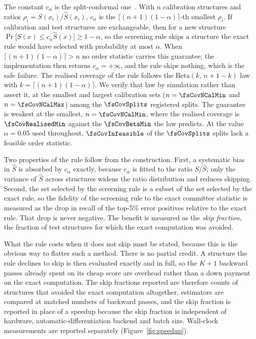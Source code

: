 The constant $c_\alpha$ is the split-conformal
one~\citep{vovk2005algorithmic,lei2018distribution}. With $n$ calibration
structures and ratios $\rho_i=S(x_i)/\hat S(x_i)$, $c_\alpha$ is the
$\lceil (n+1)(1-\alpha)\rceil$-th smallest $\rho_i$. If calibration and test
structures are exchangeable, then for a new structure
$\Pr\bigl[S(x)\le c_\alpha\hat S(x)\bigr]\ge 1-\alpha$, so the screening rule
skips a structure the exact rule would have selected with probability at most
$\alpha$. When $\lceil (n+1)(1-\alpha)\rceil>n$ no order statistic carries
this guarantee; the implementation then returns $c_\alpha=+\infty$, and the
rule skips nothing, which is the safe failure. The realised coverage of the
rule follows the $\mathrm{Beta}(k,\,n+1-k)$ law with
$k=\lceil (n+1)(1-\alpha)\rceil$. We verify that law by simulation rather
than assert it, at the smallest and largest calibration sets
($n=\fsCovNCalMin$ and $n=\fsCovNCalMax$) among the $\fsCovSplits$ registered
splits. The guarantee is weakest at the smallest, $n=\fsCovNCalMin$, where the
realised coverage is $\fsCovRealisedMin$ against the $\fsCovBetaMin$ the law
predicts. At the value $\alpha=0.05$ used throughout, $\fsCovInfeasible$ of
the $\fsCovSplits$ splits lack a feasible order statistic.

Two properties of the rule follow from the construction. First, a systematic
bias in $\hat S$ is absorbed by $c_\alpha$ exactly, because $c_\alpha$ is
fitted to the ratio $S/\hat S$; only the variance of $\hat S$ across
structures widens the ratio distribution and reduces skipping. Second, the set
selected by the screening rule is a subset of the set selected by the exact
rule, so the fidelity of the screening rule to the exact committee statistic
is measured as the drop in recall of the top-5\% error positives relative to
the exact rule. That drop is never negative. The benefit is measured as the
\emph{skip fraction}, the fraction of test structures for which the exact
computation was avoided.

What the rule costs when it does not skip must be stated, because this is the
obvious way to flatter such a method. There is no partial credit. A structure
the rule declines to skip is then evaluated exactly and in full, so the $K{+}1$
backward passes already spent on its cheap score are overhead rather than a
down payment on the exact computation. The skip fractions reported are
therefore counts of structures that avoided the exact computation altogether,
estimators are compared at matched numbers of backward passes, and the skip
fraction is reported in place of a speedup because the skip fraction is
independent of hardware, automatic-differentiation backend and batch size.
Wall-clock measurements are reported separately (Figure~\ref{fig:speedup}).

